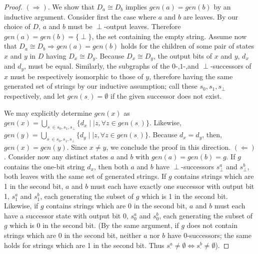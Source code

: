 \documentclass{article}
\theoremstyle{definition}
\begin{document}
\begin{proof}
$(\Rightarrow)$.  We show that $D_a \cong D_b$ implies $gen(a) = gen(b)$ by an inductive 
argument.  Consider first the case where $a$ and $b$ are leaves.  By our choice of $D$,
$a$ and $b$ must be $\perp$-output leaves.  Therefore $gen(a) = gen(b) = \{\perp\}$, the 
set containing the empty string. Assume now that $D_a \cong D_b \Rightarrow gen(a) = gen(b)$ holds
for the children of some pair of states $x$ and $y$ in $D$ having $D_x \cong D_y$.  Because 
$D_x \cong D_y$, the output bits of $x$ and $y$, $d_x$ and $d_y$, must be equal.  Similarly,
the subgraphs of the $0$-,$1$-,and $\perp$-successors of $x$ must be respectively isomorphic to those of $y$, therefore having the same generated set of strings by our inductive assumption; 
call these $s_0,s_1,s_\perp$ respectively, and let $gen(s_\cdot) = \emptyset$ if the given successor does not exist.

We may explicitly determine $gen(x)$ as 
$gen(x) = \bigcup_{s_\cdot \in s_0, s_1, s_\perp} \{ d_x \mid \mid z, \forall z \in gen(s_\cdot) \}$.  
Likewise, $gen(y) = \bigcup_{s_\cdot \in s_0, s_1, s_\perp} \{ d_y \mid \mid z, \forall z \in gen(s_\cdot) \}$.
Because $d_x = d_y$, then, $gen(x) = gen(y)$.  Since $x \neq y$, we conclude the proof in this direction.
\newline\newline
$(\Leftarrow)$.  Consider now any distinct states $a$ and $b$ with $gen(a) = gen(b) = g$.
If $g$ contains the one-bit string $d_x$, then both $a$ and 
$b$ have $\perp$-successors $s_\perp^{a}$ and $s_\perp^{b}$, both leaves with the same 
set of generated strings.  If $g$ contains 
strings which are 1 in the second bit, $a$ and $b$ must each have exactly one successor with output bit 1, 
$s_1^{a}$ and $s_1^{b}$, each generating the subset of $g$ which is 1 in the second bit.
Likewise, if $g$ contains strings which are 0 
in the second bit, $a$ and $b$ must each have a successor state with output bit 0,
$s_0^{a}$ and $s_0^{b}$, each generating the subset of $g$ which is 0 in the second bit.  (By the same 
argument, if $g$ does not contain strings which are 0 in the second bit, neither $a$ nor $b$ 
have 0-successors; the same holds for strings which are 1 in the second bit.  Thus 
$s_\cdot^{a} \neq \emptyset \iff s_\cdot^{b} \neq \emptyset$).


\end{proof}
\end{document}
